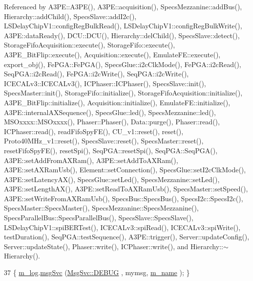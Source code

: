 Referenced by A3\+P\+E\+::\+A3\+P\+E(), A3\+P\+E\+::acquisition(), Specs\+Mezzanine\+::add\+Bus(), Hierarchy\+::add\+Child(), Specs\+Slave\+::add\+I2c(), L\+S\+Delay\+Chip\+V1\+::config\+Reg\+Bulk\+Read(), L\+S\+Delay\+Chip\+V1\+::config\+Reg\+Bulk\+Write(), A3\+P\+E\+::data\+Ready(), D\+C\+U\+::\+D\+C\+U(), Hierarchy\+::del\+Child(), Specs\+Slave\+::detect(), Storage\+Fifo\+Acquisition\+::execute(), Storage\+Fifo\+::execute(), A3\+P\+E\+\_\+\+Bit\+Flip\+::execute(), Acquisition\+::execute(), Emulate\+F\+E\+::execute(), export\+\_\+obj(), Fe\+P\+G\+A\+::\+Fe\+P\+G\+A(), Specs\+Glue\+::i2c\+Clk\+Mode(), Fe\+P\+G\+A\+::i2c\+Read(), Seq\+P\+G\+A\+::i2c\+Read(), Fe\+P\+G\+A\+::i2c\+Write(), Seq\+P\+G\+A\+::i2c\+Write(), I\+C\+E\+C\+A\+Lv3\+::\+I\+C\+E\+C\+A\+Lv3(), I\+C\+Phaser\+::\+I\+C\+Phaser(), Specs\+Slave\+::init(), Specs\+Master\+::init(), Storage\+Fifo\+::initialize(), Storage\+Fifo\+Acquisition\+::initialize(), A3\+P\+E\+\_\+\+Bit\+Flip\+::initialize(), Acquisition\+::initialize(), Emulate\+F\+E\+::initialize(), A3\+P\+E\+::internal\+A\+X\+Sequence(), Specs\+Glue\+::led(), Specs\+Mezzanine\+::led(), M\+S\+Oxxxx\+::\+M\+S\+Oxxxx(), Phaser\+::\+Phaser(), Data\+::purge(), Phaser\+::read(), I\+C\+Phaser\+::read(), read\+Fifo\+Spy\+F\+E(), C\+U\+\_\+v1\+::reset(), reset(), Proto40\+M\+Hz\+\_\+v1\+::reset(), Specs\+Slave\+::reset(), Specs\+Master\+::reset(), reset\+Fifo\+Spy\+F\+E(), reset\+Spi(), Seq\+P\+G\+A\+::reset\+Spi(), Seq\+P\+G\+A\+::\+Seq\+P\+G\+A(), A3\+P\+E\+::set\+Add\+From\+A\+X\+Ram(), A3\+P\+E\+::set\+Add\+To\+A\+X\+Ram(), A3\+P\+E\+::set\+A\+X\+Ram\+Usb(), Element\+::set\+Connection(), Specs\+Glue\+::set\+I2c\+Clk\+Mode(), A3\+P\+E\+::set\+Latency\+A\+X(), Specs\+Glue\+::set\+Led(), Specs\+Mezzanine\+::set\+Led(), A3\+P\+E\+::set\+Length\+A\+X(), A3\+P\+E\+::set\+Read\+To\+A\+X\+Ram\+Usb(), Specs\+Master\+::set\+Speed(), A3\+P\+E\+::set\+Write\+From\+A\+X\+Ram\+Usb(), Specs\+Bus\+::\+Specs\+Bus(), Specs\+I2c\+::\+Specs\+I2c(), Specs\+Master\+::\+Specs\+Master(), Specs\+Mezzanine\+::\+Specs\+Mezzanine(), Specs\+Parallel\+Bus\+::\+Specs\+Parallel\+Bus(), Specs\+Slave\+::\+Specs\+Slave(), L\+S\+Delay\+Chip\+V1\+::spi\+B\+E\+R\+Test(), I\+C\+E\+C\+A\+Lv3\+::spi\+Read(), I\+C\+E\+C\+A\+Lv3\+::spi\+Write(), test\+Duration(), Seq\+P\+G\+A\+::test\+Sequence(), A3\+P\+E\+::trigger(), Server\+::update\+Config(), Server\+::update\+State(), Phaser\+::write(), I\+C\+Phaser\+::write(), and Hierarchy\+::$\sim$\+Hierarchy().


\begin{DoxyCode}
37 \{ \hyperlink{classObject_a0d269813dd7ac1f24bc143031e2963f2}{m\_log}.\hyperlink{classMsgSvc_ad25f18047920cc59a314e5098259711c}{msgSvc} (\hyperlink{classMsgSvc_ae671eb7301996cd049d2da8a65925926a1dbdcc82dce88370ec335883c83b38b0}{MsgSvc::DEBUG}   , mymsg, \hyperlink{classObject_a8b83c95c705d2c3ba0d081fe1710f48d}{m\_name} ); \}
\end{DoxyCode}
\mbox{\label{classObject_a6c9a0397ca804e04d675ed05683f5420}} 
